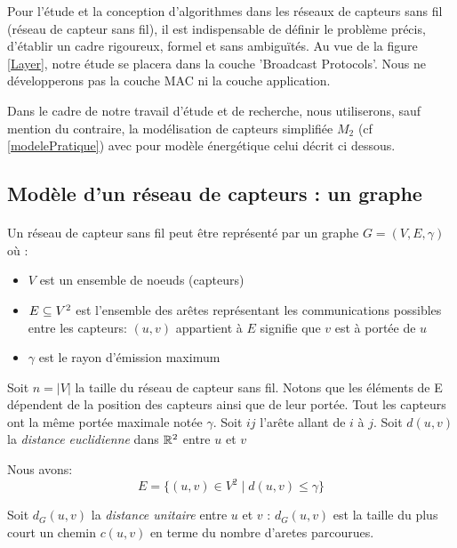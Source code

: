 Pour l'étude et la conception d'algorithmes dans les réseaux de capteurs sans fil (réseau de capteur sans fil), il est indispensable de définir le problème précis, d'établir un cadre rigoureux, formel et sans ambiguïtés.
 Au vue de la figure \ref{Layer}, notre étude se placera dans la couche 'Broadcast Protocols'. Nous ne développerons pas la couche MAC ni la couche application.

Dans le cadre de notre travail d'étude et de recherche, nous utiliserons, sauf mention du contraire, la modélisation de capteurs simplifiée $M_2$ (cf \ref{modelePratique}) avec pour modèle énergétique celui décrit ci dessous.

\subsection{Modèle d'un réseau de capteurs : un graphe}

 \paragraph*{} Un réseau de capteur sans fil peut être représenté par un graphe $G= (V,E,\gamma)$ où :
 \begin{itemize}
 \item $V$ est un ensemble de noeuds (capteurs)
 \item $E \subseteq V \textsuperscript{2}$ est l'ensemble des arêtes représentant les communications possibles entre les capteurs: $(u,v)$ appartient à $E$ signifie que $v$ est à portée de $u$
 \item $\gamma$ est le rayon d'émission maximum
 \end{itemize}
 
 

\begin{mynot}
Soit $ n=|V| $ la taille du réseau de capteur sans fil. Notons que les éléments de E dépendent de la position des capteurs ainsi que de leur portée. Tout les capteurs ont la même portée maximale notée $\gamma$. 
Soit $ij$ l'arête allant de $i$ à $j$. 
Soit $d(u,v)$ la \textit{distance euclidienne} dans $\mathbb{R} \textsuperscript{2}$ entre $u$ et $v$
\end{mynot}
Nous avons:
$$E = \{ (u,v) \in V ^{2} \mid d(u,v) \leq \gamma \}$$

\begin{mydef}
Soit $d_G(u,v)$ la \textit{distance unitaire} entre $ u $ et $ v $ : $d_G(u,v)$ est la taille du plus court un chemin $c(u,v)$ en terme du nombre d'aretes parcourues. 
\end{mydef}


